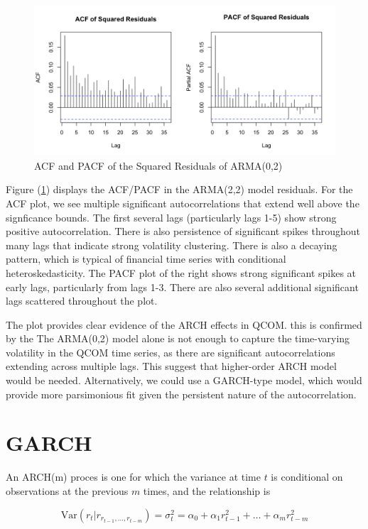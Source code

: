 \begin{figure}[!h]
	\centering
	\includegraphics[width=0.85\linewidth]{content/plots/ACF_PACF_squared_residuals_QCOM.png}
	\caption{ACF and PACF of the Squared Residuals of ARMA(0,2)}
	\label{fig:ACF_PACF_residuals_QCOM}
\end{figure}

Figure (\ref{fig:ACF_PACF_residuals_QCOM}) displays the ACF/PACF in the ARMA(2,2) model residuals. For the ACF plot, we see multiple significant autocorrelations that extend well above the signficance bounds. The first several lags (particularly lags 1-5) show strong positive autocorrelation. There is also persistence of significant spikes throughout many lags that indicate strong volatility clustering. There is also a decaying pattern, which is typical of financial time series with conditional heteroskedasticity. The PACF plot of the right shows strong significant spikes at early lags, particularly from lags 1-3. There are also several additional significant lags scattered throughout the plot.

The plot provides clear evidence of the ARCH effects in QCOM. this is confirmed by the  The ARMA(0,2) model alone is not enough to capture the time-varying volatility in the QCOM time series, as there are significant autocorrelations extending across multiple lags. This suggest that higher-order ARCH model would be needed. Alternatively, we could use a GARCH-type model, which would provide more parsimonious fit given the persistent nature of the autocorrelation.

\section{GARCH}

An ARCH(m) proces is one for which the variance at time $t$ is conditional on observations at the previous $m$ times, and the relationship is

\begin{equation}
	\text{Var}\left(r_t|r_{r_{t-1},\ldots,r_{t-m}}\right)=\sigma_t^2=\alpha_0+\alpha_1r_{t-1}^2+\ldots+\alpha_{m}r_{t-m}^2
\end{equation}

